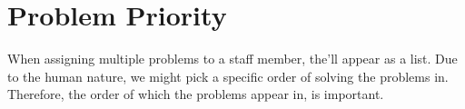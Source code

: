 \section{Problem Priority}
\label{sec:problem_priority}

When assigning multiple problems to a staff member, the'll appear as a list. Due to the human nature, we might pick a specific order of solving the problems in. Therefore, the order of which the problems appear in, is important.

